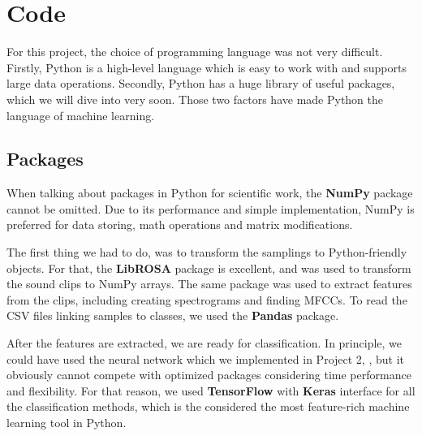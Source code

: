 \section{Code} \label{sec:code}
For this project, the choice of programming language was not very difficult. Firstly, Python is a high-level language which is easy to work with and supports large data operations. Secondly, Python has a huge library of useful packages, which we will dive into very soon. Those two factors have made Python the language of machine learning. 

\subsection{Packages}
When talking about packages in Python for scientific work, the \textbf{NumPy} package cannot be omitted. Due to its performance and simple implementation, NumPy is preferred for data storing, math operations and matrix modifications. \cite{numpy}

The first thing we had to do, was to transform the samplings to Python-friendly objects. For that, the \textbf{LibROSA} package is excellent, and was used to transform the sound clips to NumPy arrays. The same package was used to extract features from the clips, including creating spectrograms and finding MFCCs. \cite{librosa} To read the CSV files linking samples to classes, we used the \textbf{Pandas} package. \cite{pandas}

After the features are extracted, we are ready for classification. In principle, we could have used the neural network which we implemented in Project 2, \cite{Nordhagen}, but it obviously cannot compete with optimized packages considering time performance and flexibility. For that reason, we used \textbf{TensorFlow} with \textbf{Keras} interface for all the classification methods, which is the considered the most feature-rich machine learning tool in Python. \cite{tensorflow}

